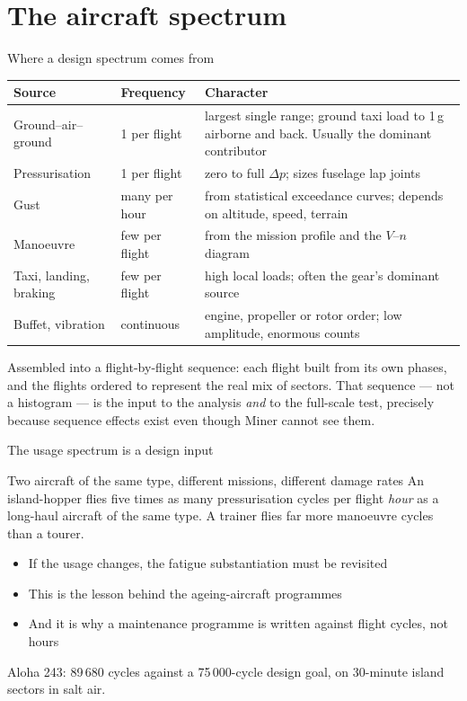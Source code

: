 \documentclass[aspectratio=169,10pt]{beamer}
\begin{document}
\section{The aircraft spectrum}

\begin{frame}{Where a design spectrum comes from}
\footnotesize
\begin{tabular}{@{}llp{7.0cm}@{}}
\toprule
Source & Frequency & Character \\
\midrule
Ground--air--ground & 1 per flight & largest single range; ground taxi load to 1\,g airborne and back. \alert{Usually the dominant contributor} \\
Pressurisation & 1 per flight & zero to full $\Delta p$; sizes fuselage lap joints \\
Gust & many per hour & from statistical exceedance curves; depends on altitude, speed, terrain \\
Manoeuvre & few per flight & from the mission profile and the $V$--$n$ diagram \\
Taxi, landing, braking & few per flight & high local loads; often the gear's dominant source \\
Buffet, vibration & continuous & engine, propeller or rotor order; low amplitude, enormous counts \\
\bottomrule
\end{tabular}
\vspace{4pt}

\normalsize
Assembled into a \alert{flight-by-flight sequence}: each flight built from its own phases, and the flights ordered to represent the real mix of sectors. That sequence --- not a histogram --- is the input to the analysis \emph{and} to the full-scale test, precisely because sequence effects exist even though Miner cannot see them.
\end{frame}

\begin{frame}{The usage spectrum is a design input}
\begin{alertblock}{Two aircraft of the same type, different missions, different damage rates}
An island-hopper flies five times as many pressurisation cycles per flight \emph{hour} as a long-haul aircraft of the same type. A trainer flies far more manoeuvre cycles than a tourer.
\end{alertblock}
\vspace{4pt}
\begin{itemize}
  \item If the usage changes, \alert{the fatigue substantiation must be revisited}
  \item This is the lesson behind the ageing-aircraft programmes
  \item And it is why a maintenance programme is written against flight \alert{cycles}, not hours
\end{itemize}
\vspace{4pt}
\footnotesize Aloha 243: 89\,680 cycles against a 75\,000-cycle design goal, on 30-minute island sectors in salt air.
\end{frame}
\end{document}
